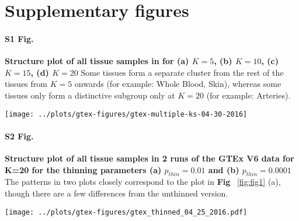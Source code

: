\clearpage
\section{Supplementary figures}

\paragraph*{S1 Fig.}
\label{figS0}
{\bf Structure plot of all tissue samples in for (a) $K=5$, (b) $K=10$, (c) $K=15$, (d) $K=20$} Some tissues form a separate cluster from the rest of the tissues from $K=5$ onwards (for example: Whole Blood, Skin), whereas some tissues only form a distinctive subgroup only at $K=20$ (for example: Arteries).
\begin{figure*}[ht]
\centering
\texttt{[image: ../plots/gtex-figures/gtex-multiple-ks-04-30-2016]}
\end{figure*}
\clearpage

\paragraph*{S2 Fig.}
\label{figS1}  
{\bf Structure plot of all tissue samples in 2 runs of the GTEx V6 data for  K=20 for the thinning parameters (a) $p_{thin}=0.01$ and (b) $p_{thin}=0.0001$} The patterns in two plots closely correspond to the plot in \textbf{Fig} ~\ref{fig:fig1} (a), though there are a few differences from the unthinned version. 
\begin{figure*}[ht]
\centering
\texttt{[image: ../plots/gtex-figures/gtex\_thinned\_04\_25\_2016.pdf]}
\end{figure*}
\clearpage

